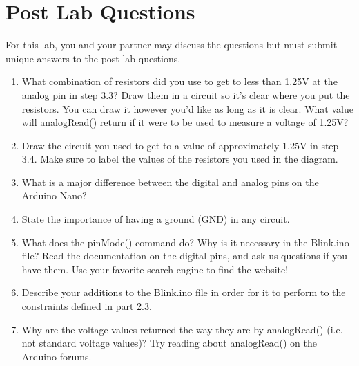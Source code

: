 \documentclass[12pt]{article}
\begin{document}
	\section*{Post Lab Questions}
	For this lab, you and your partner may discuss the questions but must submit unique answers to the post lab questions. 
	
	\begin{enumerate}
	    \item What combination of resistors did you use to get to less than 1.25V at the analog pin in step 3.3? Draw them in a circuit so it's clear where you put the resistors. You can draw it however you'd like as long as it is clear. What value will analogRead() return if it were to be used to measure a voltage of 1.25V?
	    
	    \item Draw the circuit you used to get to a value of approximately 1.25V in step 3.4. Make sure to label the values of the resistors you used in the diagram.
	    
	    \item What is a major difference between the digital and analog pins on the Arduino Nano?
	    
	    \item State the importance of having a ground (GND) in any circuit.
	    
		\item What does the pinMode() command do? Why is it necessary in the Blink.ino file? Read the documentation on the digital pins, and ask us questions if you have them. Use your favorite search engine to find the website!
		
		\item Describe your additions to the Blink.ino file in order for it to perform to the constraints defined in part 2.3.
		
		
        \item Why are the voltage values returned the way they are by analogRead() (i.e. not standard voltage values)? Try reading about analogRead() on the Arduino forums. 
        
        

\end{enumerate}
\end{document}
